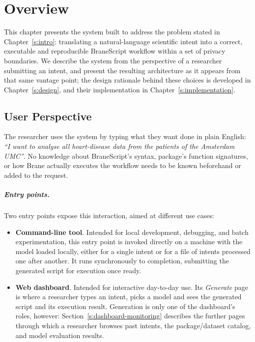 \chapter{Overview}\label{s:overview}

This chapter presents the system built to address the problem stated in
Chapter~\ref{s:intro}: translating a natural-language scientific intent into a
correct, executable and reproducible BraneScript workflow within a set of privacy boundaries.
We describe the system from the perspective of a researcher submitting an intent, and present the resulting
architecture as it appears from that same vantage point; the design
rationale behind these choices is developed in Chapter~\ref{s:design}, and
their implementation in Chapter~\ref{s:implementation}.

\section{User Perspective}\label{s:user-perspective}

The researcher uses the system by typing what they want done in plain English: 
\emph{``I want to analyse all heart-disease data from the patients of the Amsterdam UMC''}. 
No knowledge about BraneScript's syntax, package's function
signatures, or how Brane actually executes the workflow needs to be known
beforehand or added to the request.

\paragraph{Entry points.} Two entry points expose this interaction, aimed at different use cases:

\begin{itemize}
    \item \textbf{Command-line tool}. Intended for
        local development, debugging, and batch experimentation, this entry
        point is invoked directly on a machine with the model loaded locally,
        either for a single intent or for a file of intents processed one
        after another. It runs synchronously to completion, submitting the
        generated script for execution once ready.

    \item \textbf{Web dashboard}. Intended for interactive day-to-day use. Its \emph{Generate}
        page is where a researcher types an intent, picks a model and
        sees the generated script and its execution result. 
        Generation is only one of the dashboard's roles, however: Section~\ref{s:dashboard-monitoring}
        describes the further pages through which a researcher browses past
        intents, the package/dataset catalog, and model evaluation results.
\end{itemize}


